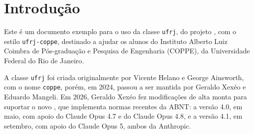 \documentclass[dsc,setavermelha,numeracaoporcapitulo,linhanafolhaderosto]{ufrj}
\theoremstyle{plain}
\theoremstyle{definition}
\theoremstyle{remark}
\begin{document}
  \listoffigures
  \listofframes
  \listofmapas
  \listofprograms
  \listofalgorithms
  \listoftables
  \printloabbreviations
  \printloacronyms
  \printlosymbols
  \tableofcontents

  \mainmatter
  \chapter{Introdução}

  Este é um documento exemplo para o uso da classe \verb|ufrj|, do projeto \CoppeTeX, com o estilo \verb|ufrj-coppe|, destinado a ajudar os alunos do Instituto Alberto Luiz Coimbra de Pós-graduação e Pesquisa de Engenharia (COPPE), da Universidade Federal do Rio de Janeiro.

  A classe \verb|ufrj| foi criada originalmente por Vicente Helano e George Ainsworth, com o nome \verb|coppe|, porém, em 2024, passou a ser mantida por Geraldo Xexéo e Eduardo Mangeli.
  Em 2026, Geraldo Xexéo fez modificações de alta monta para suportar o novo , que implementa normas recentes da ABNT: a versão 4.0, em maio, com apoio do Claude Opus 4.7 e do Claude Opus 4.8, e a versão 4.1, em setembro, com apoio do Claude Opus 5, ambos da Anthropic.
\end{document}
